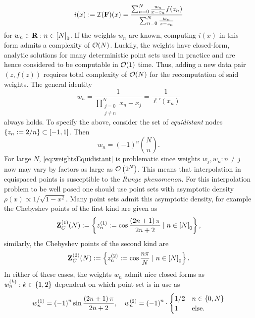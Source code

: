 \documentclass[12pt, oneside]{amsart}
\theoremstyle{definition}
\theoremstyle{remark}
\numberwithin{equation}{section}
\begin{document}
\begin{equation}\label{eq:barycentricLagrange}
    i(x) := \mathcal{I}(\mathbf{F})(x) = \frac{\sum_{n=0}^N \frac{w_n}{x-z_n} f(z_n)}{\sum_{n=0}^N \frac{w_n}{x-z_n}}
\end{equation}
for \(w_n \in \mathbf{R} : n \in {[N]}_0\). If the weights \(w_n\) are known, computing \(i(x)\) in this form admits a complexity of \(\mathcal{O}(N)\). Luckily, the weights have closed-form, analytic solutions for many deterministic point sets used in practice and are hence considered to be computable in \(\mathcal{O}(1)\) time. Thus, adding a new data pair \((z, f(z))\) requires total complexity of \(\mathcal{O}(N)\) for the recomputation of said weights. The general identity \[
    w_n = \frac{1}{\prod_{\substack{j=0\\j \neq n}}^N x_n - x_j} = \frac{1}{\ell'(x_n)}
\]
always holds. To specify the above, consider the set of \emph{equidistant} nodes \(\left\{z_n := 2/n\right\} \subset [-1, 1]\). Then \begin{equation}\label{eq:weightsEquidistant}
    w_n = {\left(-1\right)}^n {N \choose n}.
\end{equation}
For large \(N\), \cref{eq:weightsEquidistant} is problematic since weights \(w_j, w_n: n \neq j\) now may vary by factors as large as \(\mathcal{O}\left(2^N\right)\). This means that interpolation in equispaced points is susceptible to the \emph{Runge phenomenon}. For this interpolation problem to be well posed one should use point sets with asymptotic density \(\rho(x) \propto 1/\sqrt{1-x^2}\). Many point sets admit this asymptotic density, for example the Chebyshev points of the first kind are given as
\begin{equation}\label{eq:chebyPts1}
    \mathbf{Z}_C^{(1)}(N) := \left\{z^{(1)}_n := \cos \frac{\left(2n+1\right) \pi}{2n+2} \mid n \in {[N]}_0\right\},
\end{equation}
similarly, the Chebyshev points of the second kind are
\begin{equation}\label{eq:chebyPts2}
    \mathbf{Z}_C^{(2)}(N) := \left\{z^{(2)}_n := \cos \frac{n\pi}{N} \mid n \in {[N]}_0\right\}.
\end{equation}
In either of these cases, the weights \(w_n\) admit nice closed forms as \(w_n^{(k)}: k \in \left\{1,2\right\}\) dependent on which point set is in use as
\begin{equation}\label{eq:weightsChebyshev}
    w_n^{(1)} = {\left(-1\right)}^n \sin \frac{\left(2n+1\right) \pi}{2n+2}, \quad w_n^{(2)} = {\left(-1\right)}^n \cdot \begin{cases}
        1/2 &n \in \left\{0, N\right\}\\
        1 &\text{else.}
    \end{cases}
\end{equation}
\end{document}
